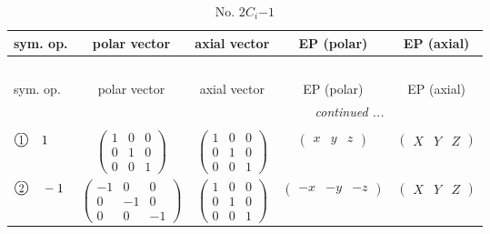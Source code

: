 \documentclass[fleqn,10pt,landscape]{jsarticle}
\begin{document}
\begin{center}
\renewcommand{\arraystretch}{1.3}
\begin{longtable}{lcccc}
\caption{No. 2\quad$C_{i}$\quad$-1$\quad[ triclinic ]}
 \\
 \hline \hline
sym. op. & polar vector & axial vector & EP (polar) & EP (axial) \\ \hline \endfirsthead

\multicolumn{4}{l}{\tablename\ \thetable{}} \\
 \hline \hline
sym. op. & polar vector & axial vector & EP (polar) & EP (axial) \\ \hline \endhead

 \hline \hline
\multicolumn{4}{r}{\footnotesize\it continued ...} \\ \endfoot

 \hline \hline
\multicolumn{4}{r}{} \\ \endlastfoot

$ {\ooalign{\hfil\resizebox{.8\width}{\height}{1}\hfil\crcr\raise.1ex\hbox{\large$\bigcirc$}}}\quad 1 $ & $ \begin{pmatrix} 1 & 0 & 0 \\ 0 & 1 & 0 \\ 0 & 0 & 1 \end{pmatrix} $ & $ \begin{pmatrix} 1 & 0 & 0 \\ 0 & 1 & 0 \\ 0 & 0 & 1 \end{pmatrix} $ & $ \begin{pmatrix} x & y & z \end{pmatrix} $ & $ \begin{pmatrix} X & Y & Z \end{pmatrix} $ \\
$ {\ooalign{\hfil\resizebox{.8\width}{\height}{2}\hfil\crcr\raise.1ex\hbox{\large$\bigcirc$}}}\quad -1 $ & $ \begin{pmatrix} -1 & 0 & 0 \\ 0 & -1 & 0 \\ 0 & 0 & -1 \end{pmatrix} $ & $ \begin{pmatrix} 1 & 0 & 0 \\ 0 & 1 & 0 \\ 0 & 0 & 1 \end{pmatrix} $ & $ \begin{pmatrix} - x & - y & - z \end{pmatrix} $ & $ \begin{pmatrix} X & Y & Z \end{pmatrix} $ \\
\end{longtable}
\end{center}
\end{document}
